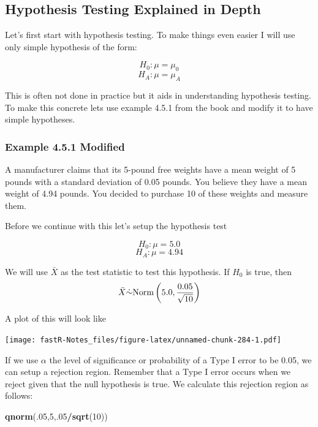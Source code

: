 \documentclass[]{book}
\newenvironment{Shaded}{\begin{snugshade}}{\end{snugshade}}
\newcommand{\KeywordTok}[1]{\textcolor[rgb]{0.13,0.29,0.53}{\textbf{#1}}}
\newcommand{\DecValTok}[1]{\textcolor[rgb]{0.00,0.00,0.81}{#1}}
\newcommand{\OperatorTok}[1]{\textcolor[rgb]{0.81,0.36,0.00}{\textbf{#1}}}
\newcommand{\NormalTok}[1]{#1}
\theoremstyle{definition}
\theoremstyle{definition}
\theoremstyle{definition}
\theoremstyle{remark}
\begin{document}
\subsection{Hypothesis Testing Explained in
Depth}\label{hypothesis-testing-explained-in-depth}

Let's first start with hypothesis testing. To make things even easier I
will use only simple hypothesis of the form:

\[H_{0}: \mu = \mu_{0}\] \[H_{A}: \mu = \mu_{A}\]

This is often not done in practice but it aids in understanding
hypothesis testing. To make this concrete lets use example 4.5.1 from
the book and modify it to have simple hypotheses.

\subsubsection{Example 4.5.1 Modified}\label{example-4.5.1-modified}

A manufacturer claims that its 5-pound free weights have a mean weight
of 5 pounds with a standard deviation of 0.05 pounds. You believe they
have a mean weight of 4.94 pounds. You decided to purchase 10 of these
weights and measure them.

Before we continue with this let's setup the hypothesis test

\[H_{0}: \mu = 5.0\] \[H_{A}: \mu = 4.94\]

We will use \(\bar{X}\) as the test statistic to test this hypothesis.
If \(H_{0}\) is true, then\\
\[\bar{X}\dot{\sim}\mbox{Norm}\left(5.0,{0.05 \over \sqrt{10}}\right)\]

A plot of this will look like

\texttt{[image: fastR-Notes\_files/figure-latex/unnamed-chunk-284-1.pdf]}

If we use \(\alpha\) the level of significance or probability of a Type
I error to be 0.05, we can setup a rejection region. Remember that a
Type I error occurs when we reject given that the null hypothesis is
true. We calculate this rejection region as follows:

\begin{Shaded}
\begin{Highlighting}[]
\KeywordTok{qnorm}\NormalTok{(.}\DecValTok{05}\NormalTok{,}\DecValTok{5}\NormalTok{,.}\DecValTok{05}\OperatorTok{/}\KeywordTok{sqrt}\NormalTok{(}\DecValTok{10}\NormalTok{))}
\end{Highlighting}
\end{Shaded}
\end{document}

